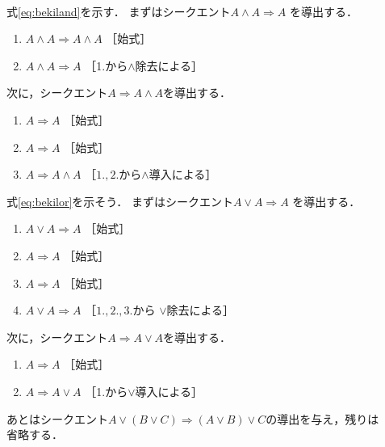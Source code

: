 \begin{description}
\item[] \mbox{} \\
  式\eqref{eq:bekiland}を示す．
  まずはシークエント$A \land A \Longrightarrow A$
  を導出する．
  \begin{enumerate}[1. ]
    \item $A \land A \Longrightarrow A \land A$ \quad ［始式］
    \item $A \land A \Longrightarrow A$ \quad 
      ［1.から$\land$除去による］
  \end{enumerate}
  次に，シークエント$A \Longrightarrow A \land A$を導出する．
  \begin{enumerate}[1. ]
    \item $A \Longrightarrow A$ \quad ［始式］
    \item $A \Longrightarrow A$ \quad ［始式］
    \item $A \Longrightarrow A \land A$ \quad 
      ［$1.,2.$から$\land$導入による］
  \end{enumerate}
  式\eqref{eq:bekilor}を示そう．
  まずはシークエント$A \lor A \Longrightarrow A$
  を導出する．
  \begin{enumerate}[1. ]
    \item $A \lor A \Longrightarrow A$ 
      \quad ［始式］
    \item $A \Longrightarrow A$ \quad ［始式］
    \item $A \Longrightarrow A$ \quad ［始式］
    \item $A \lor A \Longrightarrow A$ \quad ［$1.,2.,3.$から
      $\lor$除去による］
  \end{enumerate}
  次に，シークエント$A \Longrightarrow A \lor A$を導出する．
  \begin{enumerate}[1. ]
    \item $A \Longrightarrow A$ \quad ［始式］
    \item $A \Longrightarrow A \lor A$ \quad ［1.から$\lor$導入による］
  \end{enumerate}

  あとはシークエント$A \lor ( B \lor C) \Longrightarrow 
  (A \lor B ) \lor C$の導出を与え，残りは省略する．


\end{description}

